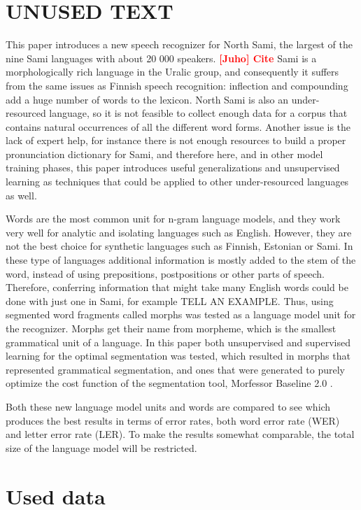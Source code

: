 \documentclass[10pt,b5paper,utf8]{article}
\newcommand{\todo}[2]{{\textcolor{red}{\bf [#1] #2 }}}
\begin{document}
\section{UNUSED TEXT}

This paper introduces a new speech recognizer for North Sami, the largest of the nine Sami languages with about 20 000 speakers. \todo{Juho}{Cite}  Sami is a morphologically rich language in the Uralic group, and consequently it suffers from the same issues as Finnish speech recognition: inflection and compounding add a huge number of words to the lexicon. North Sami is also an under-resourced language, so it is not feasible to collect enough data for a corpus that contains natural occurrences of all the different word forms. Another issue is the lack of expert help, for instance there is not enough resources to build a proper pronunciation dictionary for Sami, and therefore here, and in other model training phases, this paper introduces useful generalizations and unsupervised learning as techniques that could be applied to other under-resourced languages as well.

Words are the most common unit for n-gram language models, and they work very well for analytic and isolating languages such as English. However, they are not the best choice for synthetic languages such as Finnish, Estonian or Sami. In these type of languages additional information is mostly added to the stem of the word, instead of using prepositions, postpositions or other parts of speech. Therefore, conferring information that might take many English words could be done with just one in Sami, for example TELL AN EXAMPLE. Thus, using segmented word fragments called morphs was tested as a language model unit for the recognizer. Morphs get their name from morpheme, which is the smallest grammatical unit of a language. In this paper both unsupervised and supervised learning for the optimal segmentation was tested, which resulted in morphs that represented grammatical segmentation, and ones that were generated to purely optimize the cost function of the segmentation tool, Morfessor Baseline 2.0 \cite{virpioja2013morfessor}. 

Both these new language model units and words are compared to see which produces the best results in terms of error rates, both word error rate (WER) and letter error rate (LER). To make the results somewhat comparable, the total size of the language model will be restricted.

\section{Used data}
\end{document}
